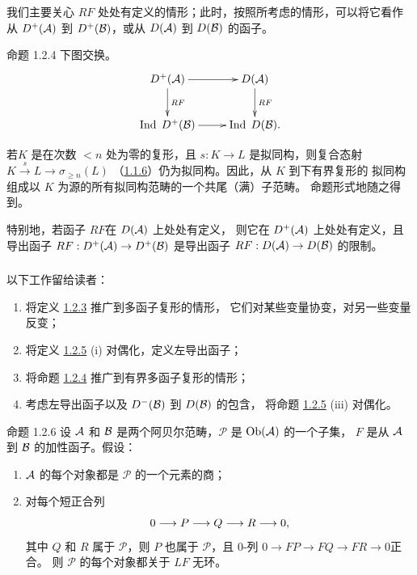 我们主要关心 $RF$ 处处有定义的情形；此时，按照所考虑的情形，可以将它看作
从 $D^{+}({\mathcal A})$ 到 $D^{+}({\mathcal B})$，或从 $D({\mathcal A})$ 到 $D({\mathcal B})$ 的函子。

\begin{enonce*}{命题 1.2.4}
下图交换。
\[
\xymatrix{
D^{+}(\mathcal{A})  \ar[r] \ar[d]^{RF}& D(\mathcal{A})\ar[d]^{RF}        \\
 \Ind \;D^{+}(\mathcal{B}) \ar[r] & \Ind \; D(\mathcal{B}).
}
\]
\end{enonce*}

若\pageoriginale $K$ 是在次数 $<n$ 处为零的复形，且 $s:K\rightarrow L$
是拟同构，则复合态射 $K\xrightarrow{s}L\rightarrow \sigma_{\geq n}(L)$
（\hyperref[XVII.subsubsec1.1.6]{1.1.6}）仍为拟同构。因此，从 $K$ 到下有界复形的
拟同构组成以 $K$ 为源的所有拟同构范畴的一个共尾（满）子范畴。
命题形式地随之得到。

特别地，若函子 $RF$在 $D({\mathcal A})$ 上处处有定义，
则它在 $D^{+}({\mathcal A})$ 上处处有定义，且导出函子
$RF:D^{+}({\mathcal A})\rightarrow D^{+}({\mathcal B})$ 是导出函子
$RF:D({\mathcal A})\rightarrow D({\mathcal B})$ 的限制。

\setcounter{subsubsection}{4}
\subsubsection{}
以下工作留给读者：
\begin{enumerate}
\renewcommand{\theenumi}{\roman{enumi}}
\renewcommand{\labelenumi}{(\theenumi)}
\item 将定义 \hyperref[XVII.def1.2.3]{1.2.3} 推广到多函子复形的情形，
它们对某些变量协变，对另一些变量反变；

\item 将定义 \hyperref[XVII.subsubsec1.2.5]{1.2.5} (i) 对偶化，定义左导出函子；

\item 将命题 \hyperref[XVII.prop1.2.4]{1.2.4} 推广到有界多函子复形的情形；

\item 考虑左导出函子以及 $D^{-}({\mathcal B})$ 到 $D({\mathcal B})$ 的包含，
将命题 \hyperref[XVII.subsubsec1.2.5]{1.2.5} (iii) 对偶化。
\end{enumerate}

\begin{enonce*}{命题 1.2.6}
设 ${\mathcal A}$ 和 ${\mathcal B}$ 是两个阿贝尔范畴，$𝒫$ 是 $\operatorname{Ob}({\mathcal A})$ 的一个子集，
$F$ 是从 ${\mathcal A}$ 到 ${\mathcal B}$ 的加性函子。假设：
\begin{enumerate}
\renewcommand{\theenumi}{\alph{enumi}}
\renewcommand{\labelenumi}{(\theenumi)}
\item ${\mathcal A}$ 的每个对象都是 $𝒫$ 的一个元素的商；

\item 对每个短正合列
\[
0\longrightarrow P\longrightarrow Q\longrightarrow R\longrightarrow
0{},
\]
其中 $Q$ 和 $R$ 属于 $𝒫$，则 $P$ 也属于 $𝒫$，且 $0$-列
$0\rightarrow FP\rightarrow FQ\rightarrow FR\rightarrow 0$\pageoriginale 正合。
则 $𝒫$ 的每个对象都关于 $LF$ 无环。
\end{enumerate}
\end{enonce*}

